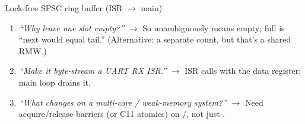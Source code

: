 \begin{gymproblem}{Lock-free SPSC ring buffer (ISR $\rightarrow$ main)}
\followups
\begin{enumerate}
\item \emph{``Why leave one slot empty?''} $\rightarrow$ So 
  unambiguously means empty; full is ``next would equal tail.'' (Alternative:
  a separate count, but that's a shared RMW.)
\item \emph{``Make it byte-stream a UART RX ISR.''} $\rightarrow$ ISR calls
   with the data register; main loop drains it.
\item \emph{``What changes on a multi-core / weak-memory system?''}
  $\rightarrow$ Need acquire/release barriers (or C11 atomics) on
  /, not just .
\end{enumerate}
\end{gymproblem}

